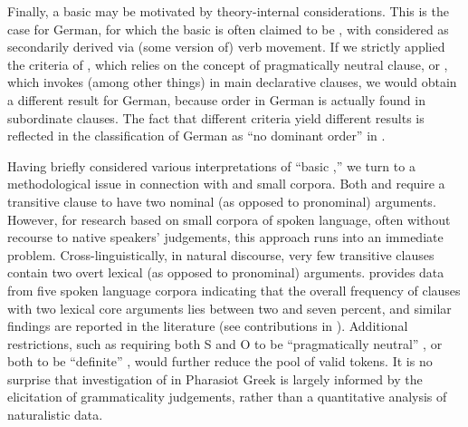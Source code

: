 \documentclass[output=paper,colorlinks,citecolor=brown,collectionchapter]{langscibook}
\begin{document}
Finally, a basic  may be motivated by theory-internal considerations. This is the case for German, for which the basic  is often claimed to be , with  considered as secondarily derived via (some version of) verb movement. If we strictly applied the criteria of \citet{bagriacik_pharasiot_2018}, which relies on the concept of pragmatically neutral clause, or \citet[116]{neocleous_word_2020}, which invokes (among other things)  in main declarative clauses, we would obtain a different result for German, because  order in German is actually found in subordinate clauses. The fact that different criteria yield different results is reflected in the classification of German as ``no dominant order'' in \citet{dryer_order_2013_OV}.

Having briefly considered various interpretations of ``basic ,'' we turn to a methodological issue in connection with  and small corpora. Both \citet{siewierska1988word} and \citet{bagriacik_pharasiot_2018} require a transitive clause to have two nominal (as opposed to pronominal) arguments. However, for research based on small corpora of spoken language, often without recourse to native speakers' judgements, this approach runs into an immediate problem. Cross-linguistically, in natural discourse, very few transitive clauses contain two overt lexical (as opposed to pronominal) arguments. \citet[62--63]{du_bois_argument_2003} provides data from five spoken language corpora indicating that the overall frequency of clauses with two lexical core arguments lies between two and seven percent, and similar findings are reported in the literature (see contributions in \citealt{du_bois_argument_2003}). Additional restrictions, such as requiring both S and O to be “pragmatically neutral” \citep{bagriacik_pharasiot_2018}, or both to be “definite” \citep{siewierska1988word}, would further reduce the pool of valid tokens. It is no surprise that \citet{bagriacik_pharasiot_2018} investigation of  in Pharasiot Greek is largely informed by the elicitation of grammaticality judgements, rather than a quantitative analysis of naturalistic data.
\end{document}
